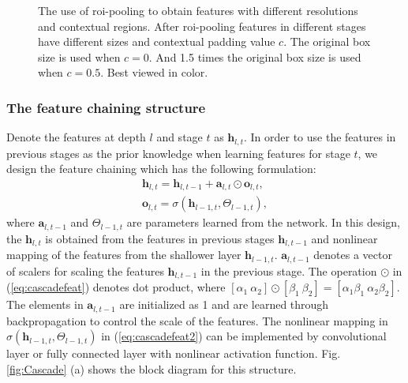 \documentclass[10pt,twocolumn,letterpaper]{article}
\begin{document}

\begin{figure}
\begin{center}
\centerline{}
\end{center}
\vspace{-10pt}
   \caption{The use of roi-pooling to obtain features with different resolutions and contextual regions. After roi-pooling features in different stages have different sizes and contextual padding value $c$. The original box size is used when $c=0$. And 1.5 times the original box size is used when $c=0.5$. Best viewed in color.}
\label{fig:Feature}
\end{figure}

\subsubsection{The feature chaining structure}
Denote the features at depth $l$ and stage $t$ as $\mathbf{h}_{l,t}$.
In order to use the features in previous stages as the prior knowledge when learning features for stage $t$, we design the feature chaining which has the following formulation:
\begin{align}
\mathbf{h}_{l,t} =\mathbf{h}_{l,t-1} +  \mathbf{a}_{l,t} \odot \mathbf{o}_{l,t},  \label{eq:cascadefeat}\\
 \mathbf{o}_{l, t} = \sigma(\mathbf{h}_{l-1,t}, \Theta_{l-1,t}),
 \label{eq:cascadefeat2}
\end{align}
where $\mathbf{a}_{l,t-1}$ and $ \Theta_{l-1,t}$ are parameters learned from the network. In this design, the $\mathbf{h}_{l,t} $ is obtained from the features in previous stages $\mathbf{h}_{l,t-1}$ and nonlinear mapping of the features from the shallower layer $\mathbf{h}_{l-1,t}$. $\mathbf{a}_{l,t-1}$ denotes a vector of scalers for scaling the features $ \mathbf{h}_{l,t-1}$ in the previous stage. The operation $\odot$ in (\ref{eq:cascadefeat}) denotes dot product, where $[\alpha_1 \  \alpha_2]\odot [\beta_1 \ \beta_2] = [\alpha_1\beta_1 \ \alpha_2 \beta_2]$.  The elements in $\mathbf{a}_{l,t-1}$ are initialized as 1 and are learned through backpropagation to control the scale of the features. 
The nonlinear mapping in $\sigma(\mathbf{h}_{l-1,t}, \Theta_{l-1,t})$ in (\ref{eq:cascadefeat2}) can be implemented by convolutional layer or fully connected layer with nonlinear activation function. Fig. \ref{fig:Cascade} (a) shows the block diagram for this structure. 
\end{document}
